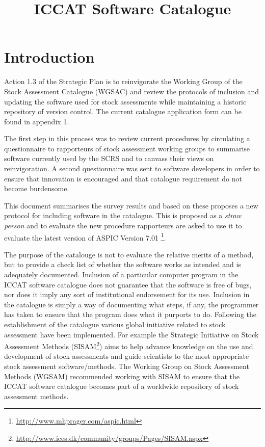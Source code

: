 \documentclass[a4paper,10pt]{article}
\title{ICCAT Software Catalogue}
\author{}
\date{}
\begin{document}
\maketitle

\section*{Introduction}

Action 1.3 of the Strategic Plan is to reinvigorate the Working Group of the Stock Assessment Catalogue (WGSAC) and review the protocols of inclusion and updating the software used for stock assessments while maintaining a historic repository of version control. The current catalogue application form can be found in appendix 1. 

The first step in this process was to review current procedures by circulating a questionnaire to rapporteurs of stock assessment working groups to summarise software currently used by the SCRS and to canvass their views on reinvigoration. A second questionnaire was sent to software developers in order to ensure that innovation is encouraged and that catalogue requirement do not become burdensome.

This document summarises the survey results and based on these proposes a new protocol for including software in the catalogue. This is proposed as a \textit{straw person} and to evaluate the new procedure rapporteurs are asked to use it to evaluate the latest version of ASPIC Version 7.01 \footnote{\url{http://www.mhprager.com/aspic.html}}.

The purpose of the catalouge is not to evaluate the relative merits of a method, but to provide a check list of whether the software works as intended and is adequately documented.  Inclusion of a particular computer program in the ICCAT software catalogue does not guarantee that the software is free of bugs, nor does it imply any sort of institutional endorsement for its use. Inclusion in the catalogue is simply a way of documenting what steps, if any, the programmer has taken to ensure that the program does what it purports to do. Following the establishment of the catalogue various global initiative related to stock assessment have been implemented. For example the Strategic Initiative on Stock Assessment Methods (SISAM\footnote{\url{http://www.ices.dk/community/groups/Pages/SISAM.aspx}}) aims to help advance knowledge on the use and development of stock assessments and guide scientists to the most appropriate stock assessment software/methods. The Working Group on Stock Assessment Methods (WGSAM) recommended working with SISAM to ensure that the ICCAT software catalogue becomes part of a worldwide repository of stock assessment methods. 
\end{document}
